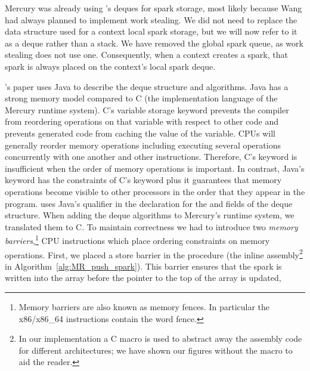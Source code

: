Mercury was already using \citet{Chase_2005_wsdeque}'s deques for spark
storage,
most likely because Wang had always planned to implement work stealing.
We did not need to replace the data structure used for a context local
spark storage,
but we will now refer to it as a deque rather than a stack.
We have removed the global spark queue,
as work stealing does not use one.
Consequently,
when a context creates a spark,
that spark is always placed on the context's local spark deque.

\citet{Chase_2005_wsdeque}'s paper uses Java to describe the deque structure
and algorithms.
Java has a strong memory model compared to C (the implementation language of
the Mercury runtime system).
C's  variable storage keyword prevents the compiler from
reordering operations on that variable with respect to other code and
prevents generated code from caching the value of the variable.
CPUs will generally reorder memory operations including executing
several operations concurrently with one another and other instructions.
Therefore, C's  keyword is insufficient when the order of
memory operations is important.
In contrast,
Java's  keyword has the constraints of C's keyword
plus it guarantees that memory operations become visible to other
processors in the order that they appear in the program.
\citet{Chase_2005_wsdeque} uses Java's  qualifier in the
declaration for the  and  fields of the deque
structure.
When adding the deque algorithms to Mercury's runtime system,
we translated them to C.
To maintain correctness we had to introduce two \emph{memory barriers},\footnote{
    Memory barriers are also known as memory fences.
    In particular the x86/x86\_64 instructions contain the word fence.}
CPU instructions which place ordering constraints on memory operations.
First, we placed a store barrier in the \push procedure
(the inline assembly\footnote{
    In our implementation a C macro is used to abstract away the assembly
    code for different architectures;
    we have shown our figures without the macro to aid the reader.}
in Algorithm~\ref{alg:MR_push_spark}).
This barrier ensures that the spark is written into the array before the pointer to
the top of the array is updated,
